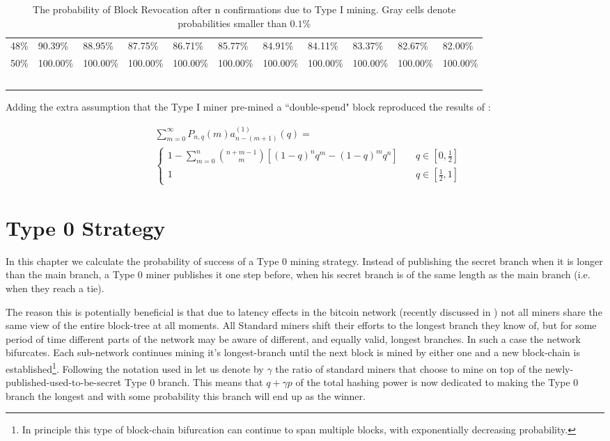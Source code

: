 \documentclass[letterpaper,12pt]{report}
\begin{document}
\begin{table}
{\begin{tabular}{l|llllllllll}
    48\% & 90.39\% & 88.95\% & 87.75\% & 86.71\% & 85.77\% & 84.91\% & 84.11\% & 83.37\% & 82.67\% & 82.00\% \\
    50\% & 100.00\% & 100.00\% & 100.00\% & 100.00\% & 100.00\% & 100.00\% & 100.00\% & 100.00\% & 100.00\% & 100.00\% \\
    ~   & ~       & ~       & ~       & ~       & ~       & ~       & ~       & ~       & ~       & ~       \\
    \end{tabular}
    }
    \caption {The probability of Block Revocation after n confirmations due to Type I mining. Gray cells denote probabilities smaller than $0.1\%$}
\end{table}

Adding the extra assumption that the Type I miner pre-mined a ``double-spend" block reproduced the results of \cite{Doublespend}:


\begin{eqnarray}\label{eq:ds}
&\sum_{m=0}^{\infty}\mathit{P}_{n,q}(m)\mathit{a}^{(1)}_{n-(m+1)}(q)=\\
&\begin{cases}
1-\sum_{m=0}^n{n + m -1\choose m}\left[(1-q)^nq^m-(1-q)^mq^n\right] & \quad q \in [0,\frac{1}{2}] \\
1 & \quad q \in [\frac{1}{2},1] 
\end{cases}
\end{eqnarray}


\chapter{Type 0 Strategy}

In this chapter we calculate the probability of success of a Type 0 mining strategy.
Instead of publishing the secret branch when it is longer than the main branch, a Type 0 miner publishes it one step before, when his secret branch is of the same length as the main branch (i.e. when they reach a tie). 

The reason this is potentially beneficial is that due to latency effects in the bitcoin network (recently discussed in \cite{Zoharetal}) not all miners share the same view of the entire block-tree at all moments. All Standard miners shift their efforts to the longest branch they know of, but for some period of time different parts of the network may be aware of different, and equally valid, longest branches. In such a case the network bifurcates. Each sub-network continues mining it's longest-branch until the next block is mined by either one and a new block-chain is established\footnote{In principle this type of block-chain bifurcation can continue to span multiple blocks, with exponentially decreasing probability.}. 
Following the notation used in \cite{Selfish} let us denote by $\gamma$ the ratio of standard miners that choose to mine on top of the newly-published-used-to-be-secret Type 0 branch.
This means that $q+\gamma p$ of the total hashing power is now dedicated to making the Type 0 branch the longest and with some probability this branch will end up as the winner. 
\end{document}
